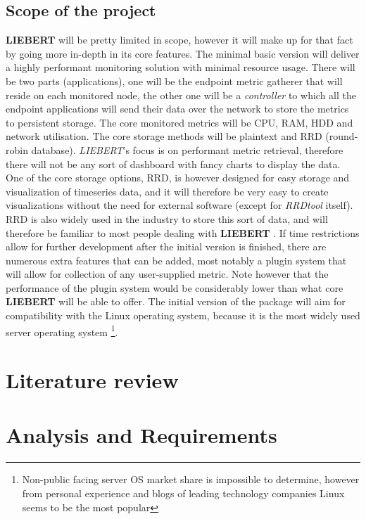 \documentclass[12pt,a4paper,table]{article}
\begin{document}
        \subsection{Scope of the project}
            \textbf{LIEBERT} will be pretty limited in scope, however it will make up for that fact by going more in-depth in its core features. The minimal basic version will deliver a highly performant monitoring solution with minimal resource usage. There will be two parts (applications), one will be the endpoint metric gatherer that will reside on each monitored node, the other one will be a \textit{controller} to which all the endpoint applications will send their data over the network to store the metrics to persistent storage. The core monitored metrics will be CPU, RAM, HDD and network utilisation. The core storage methods will be plaintext and RRD (round-robin database). \textit{LIEBERT}'s focus is on performant metric retrieval, therefore there will not be any sort of dashboard with fancy charts to display the data. One of the core storage options, RRD, is however designed for easy storage and visualization of timeseries data, and it will therefore be very easy to create visualizations without the need for external software (except for \textit{RRDtool} itself). RRD is also widely used in the industry to store this sort of data, and will therefore be familiar to most people dealing with \textbf{LIEBERT} \citep{rrdtool}. If time restrictions allow for further development after the initial version is finished, there are numerous extra features that can be added, most notably a plugin system that will allow for collection of any user-supplied metric. Note however that the performance of the plugin system would be considerably lower than what core \textbf{LIEBERT} will be able to offer. The initial version of the package will aim for compatibility with the Linux operating system, because it is the most widely used server operating system \citep{systempop}\footnote{Non-public facing server OS market share is impossible to determine, however from personal experience and blogs of leading technology companies Linux seems to be the most popular}.


    \section{Literature review}
    \section{Analysis and Requirements}
\end{document}
